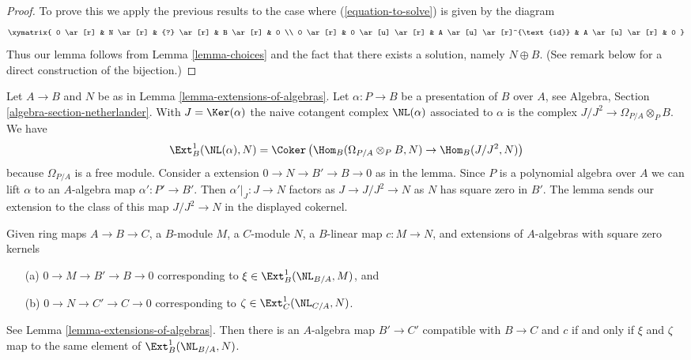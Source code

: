 \begin{proof}
To prove this we apply the previous results to the case where
(\ref{equation-to-solve}) is given by the diagram
$$
\xymatrix{
0 \ar[r] & N \ar[r] & {?} \ar[r] & B \ar[r] & 0 \\
0 \ar[r] & 0 \ar[u] \ar[r] & A \ar[u] \ar[r]^{\text{id}} & A \ar[u] \ar[r] & 0
}
$$
Thus our lemma follows from Lemma \ref{lemma-choices}
and the fact that there exists a solution, namely $N \oplus B$.
(See remark below for a direct construction of the bijection.)
\end{proof}

\begin{remark}
\label{remark-extensions-of-algebras}
Let $A \to B$ and $N$ be as in Lemma \ref{lemma-extensions-of-algebras}.
Let $\alpha : P \to B$ be a presentation of $B$ over $A$, see
Algebra, Section \ref{algebra-section-netherlander}.
With $J = \Ker(\alpha)$ the naive cotangent complex $\NL(\alpha)$
associated to $\alpha$ is the complex $J/J^2 \to \Omega_{P/A} \otimes_P B$.
We have
$$
\Ext^1_B(\NL(\alpha), N) =
\Coker\left(\Hom_B(\Omega_{P/A} \otimes_P B, N) \to \Hom_B(J/J^2, N)\right)
$$
because $\Omega_{P/A}$ is a free module.
Consider a extension $0 \to N \to B' \to B \to 0$ as in the lemma.
Since $P$ is a polynomial algebra over $A$ we can
lift $\alpha$ to an $A$-algebra map $\alpha' : P' \to B'$.
Then $\alpha'|_J : J \to N$ factors as $J \to J/J^2 \to N$
as $N$ has square zero in $B'$. The lemma sends our extension
to the class of this map $J/J^2 \to N$ in the displayed cokernel.
\end{remark}

\begin{lemma}
\label{lemma-extensions-of-algebras-functorial}
Given ring maps $A \to B \to C$, a $B$-module $M$, a $C$-module $N$,
a $B$-linear map $c : M \to N$, and extensions of
$A$-algebras with square zero kernels
\begin{enumerate}
\item[(a)] $0 \to M \to B' \to B \to 0$ corresponding to
$\xi \in \Ext^1_B(\NL_{B/A}, M)$, and
\item[(b)] $0 \to N \to C' \to C \to 0$ corresponding to
$\zeta \in \Ext^1_C(\NL_{C/A}, N)$.
\end{enumerate}
See Lemma \ref{lemma-extensions-of-algebras}.
Then there is an $A$-algebra map $B' \to C'$ compatible with
$B \to C$ and $c$ if and only if $\xi$ and $\zeta$
map to the same element of
$\Ext^1_B(\NL_{B/A}, N)$.
\end{lemma}

